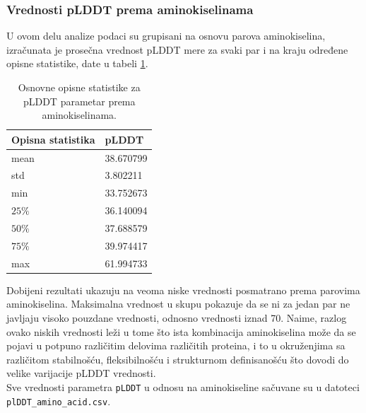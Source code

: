 \documentclass[a4paper,12pt]{article}
\begin{document}
\subsubsection{Vrednosti pLDDT prema aminokiselinama}
U ovom delu analize podaci su grupisani na osnovu parova aminokiselina, izračunata je prosečna vrednost pLDDT mere za svaki par i na kraju određene opisne statistike, date u tabeli \ref{Tabela:7}.
\begin{table}[h!]
    \centering
    \begin{tabular}{ |l|l| } 
    \hline
    \textbf{Opisna statistika} & \textbf{pLDDT} \\
    \hline
    mean & 38.670799 \\
    std  & 3.802211 \\
    min  & 33.752673 \\
    $25\%$  & 36.140094 \\
    $50\%$  & 37.688579 	\\
    $75\%$ & 39.974417\\
    max & 61.994733 	\\
    \hline
    \end{tabular}
    \caption{Osnovne opisne statistike za pLDDT parametar prema aminokiselinama.}
    \label{Tabela:7}
\end{table}

Dobijeni rezultati ukazuju na veoma niske vrednosti posmatrano prema parovima aminokiselina. Maksimalna vrednost u skupu pokazuje da se ni za jedan par ne javljaju visoko pouzdane vrednosti, odnosno vrednosti iznad 70. Naime, razlog ovako niskih vrednosti leži u tome što ista kombinacija aminokiselina može da se pojavi u potpuno različitim delovima različitih proteina, i to u okruženjima sa različitom stabilnošću, fleksibilnošću i strukturnom definisanošću što dovodi do velike varijacije pLDDT vrednosti.\\
Sve vrednosti parametra \texttt{pLDDT} u odnosu na aminokiseline sačuvane su u datoteci \texttt{plDDT\_amino\_acid.csv}.
\end{document}
